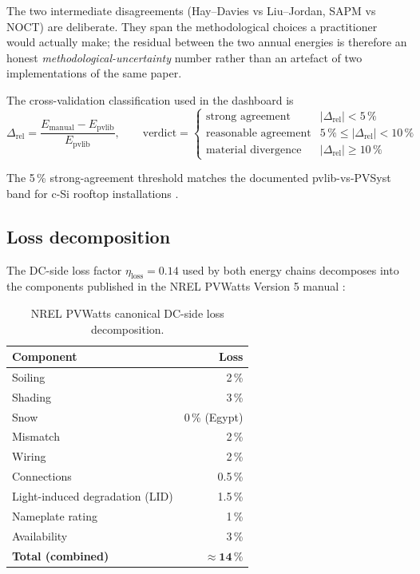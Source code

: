 The two intermediate disagreements (Hay--Davies vs Liu--Jordan, SAPM
vs NOCT) are deliberate. They span the methodological choices a
practitioner would actually make; the residual between the two
annual energies is therefore an honest \emph{methodological-uncertainty}
number rather than an artefact of two implementations of the same
paper.

The cross-validation classification used in the dashboard is
\begin{equation}
\Delta_{\text{rel}} =
  \frac{E_{\text{manual}} - E_{\text{pvlib}}}{E_{\text{pvlib}}},
\qquad
\text{verdict} =
\begin{cases}
\text{strong agreement}     & |\Delta_{\text{rel}}| < 5\,\% \\
\text{reasonable agreement} & 5\,\% \le |\Delta_{\text{rel}}| < 10\,\% \\
\text{material divergence}  & |\Delta_{\text{rel}}| \ge 10\,\%
\end{cases}
\label{eq:verdict}
\end{equation}

The 5\,\% strong-agreement threshold matches the documented
pvlib-vs-PVSyst band for c-Si rooftop installations \citep{pvlib}.

\subsection{Loss decomposition}

The DC-side loss factor $\eta_{\text{loss}} = 0.14$ used by both
energy chains decomposes into the components published in the NREL
PVWatts Version 5 manual \citep{pvwatts2014}:

\begin{table}[!htbp]
\centering
\footnotesize
\begin{tabular}{@{}lr@{}}
\toprule
\textbf{Component} & \textbf{Loss} \\
\midrule
Soiling                          & 2\,\%   \\
Shading                          & 3\,\%   \\
Snow                             & 0\,\% (Egypt) \\
Mismatch                         & 2\,\%   \\
Wiring                           & 2\,\%   \\
Connections                      & 0.5\,\% \\
Light-induced degradation (LID)  & 1.5\,\% \\
Nameplate rating                 & 1\,\%   \\
Availability                     & 3\,\%   \\
\midrule
\textbf{Total (combined)}        & $\mathbf{\approx 14\,\%}$ \\
\bottomrule
\end{tabular}
\caption{NREL PVWatts canonical DC-side loss decomposition.}
\label{tab:losses}
\end{table}

